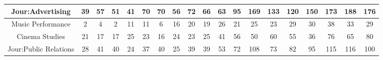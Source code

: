 \documentclass[10]{article}
\begin{document}
\begin{landscape}
\begin{longtable}[c]{|ccccccccccccccccccc|}
	\multicolumn{1}{|c|}{Jour:Advertising}                           & \multicolumn{1}{c|}{39}         & \multicolumn{1}{c|}{57}         & \multicolumn{1}{c|}{51}         & \multicolumn{1}{c|}{41}         & \multicolumn{1}{c|}{70}         & \multicolumn{1}{c|}{70}         & \multicolumn{1}{c|}{56}         & \multicolumn{1}{c|}{72}         & \multicolumn{1}{c|}{66}         & \multicolumn{1}{c|}{63}         & \multicolumn{1}{c|}{95}         & \multicolumn{1}{c|}{169}        & \multicolumn{1}{c|}{133}        & \multicolumn{1}{c|}{120}        & \multicolumn{1}{c|}{150}        & \multicolumn{1}{c|}{173}        & \multicolumn{1}{c|}{188}        & 176        \\ \hline
	\multicolumn{1}{|c|}{Music Performance}                          & \multicolumn{1}{c|}{2}          & \multicolumn{1}{c|}{4}          & \multicolumn{1}{c|}{2}          & \multicolumn{1}{c|}{11}         & \multicolumn{1}{c|}{11}         & \multicolumn{1}{c|}{6}          & \multicolumn{1}{c|}{16}         & \multicolumn{1}{c|}{20}         & \multicolumn{1}{c|}{19}         & \multicolumn{1}{c|}{26}         & \multicolumn{1}{c|}{21}         & \multicolumn{1}{c|}{25}         & \multicolumn{1}{c|}{23}         & \multicolumn{1}{c|}{29}         & \multicolumn{1}{c|}{30}         & \multicolumn{1}{c|}{38}         & \multicolumn{1}{c|}{33}         & 29         \\ \hline
	\multicolumn{1}{|c|}{Cinema Studies}                             & \multicolumn{1}{c|}{21}         & \multicolumn{1}{c|}{17}         & \multicolumn{1}{c|}{17}         & \multicolumn{1}{c|}{25}         & \multicolumn{1}{c|}{23}         & \multicolumn{1}{c|}{16}         & \multicolumn{1}{c|}{24}         & \multicolumn{1}{c|}{23}         & \multicolumn{1}{c|}{25}         & \multicolumn{1}{c|}{41}         & \multicolumn{1}{c|}{56}         & \multicolumn{1}{c|}{50}         & \multicolumn{1}{c|}{60}         & \multicolumn{1}{c|}{55}         & \multicolumn{1}{c|}{36}         & \multicolumn{1}{c|}{76}         & \multicolumn{1}{c|}{65}         & 80         \\ \hline
	\multicolumn{1}{|c|}{Jour:Public Relations}                      & \multicolumn{1}{c|}{28}         & \multicolumn{1}{c|}{41}         & \multicolumn{1}{c|}{40}         & \multicolumn{1}{c|}{24}         & \multicolumn{1}{c|}{37}         & \multicolumn{1}{c|}{40}         & \multicolumn{1}{c|}{25}         & \multicolumn{1}{c|}{39}         & \multicolumn{1}{c|}{39}         & \multicolumn{1}{c|}{53}         & \multicolumn{1}{c|}{72}         & \multicolumn{1}{c|}{108}        & \multicolumn{1}{c|}{73}         & \multicolumn{1}{c|}{82}         & \multicolumn{1}{c|}{95}         & \multicolumn{1}{c|}{115}        & \multicolumn{1}{c|}{116}        & 100        \\ \hline

\end{longtable}
\end{landscape}
\end{document}
